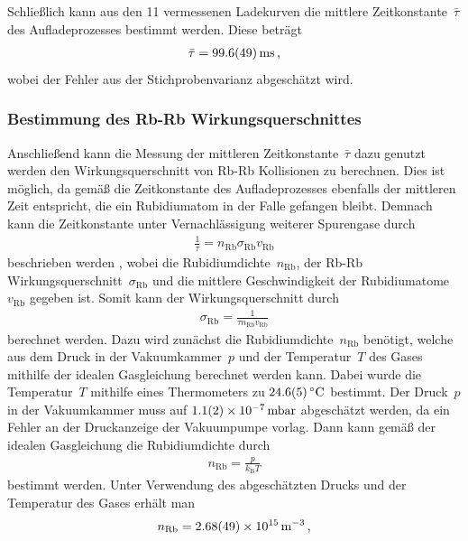 \documentclass[11pt, a4paper]{article}
\numberwithin{equation}{section}
\begin{document}
Schließlich kann aus den 11 vermessenen Ladekurven die mittlere Zeitkonstante~$\bar{\tau}$ des Aufladeprozesses bestimmt werden.
Diese beträgt
\begin{align*}
	\bar{\tau} = \SI{99.6 +- 4.9}{ms} \, \text{,}
\end{align*}
wobei der Fehler aus der Stichprobenvarianz abgeschätzt wird.

\subsubsection{Bestimmung des Rb-Rb Wirkungsquerschnittes}
Anschließend kann die Messung der mittleren Zeitkonstante~$\bar{\tau}$ dazu genutzt werden den Wirkungsquerschnitt von Rb-Rb Kollisionen zu berechnen.
Dies ist möglich, da gemäß \cite{wieman} die Zeitkonstante des Aufladeprozesses ebenfalls der mittleren Zeit entspricht, die ein Rubidiumatom in der Falle gefangen bleibt.
Demnach kann die Zeitkonstante unter Vernachlässigung weiterer Spurengase durch 
\begin{align*}
	\frac{1}{\tau} = n_\mathrm{Rb}  \sigma_\mathrm{Rb}  v_\mathrm{Rb}
\end{align*}
beschrieben werden \cite{wieman}, wobei die Rubidiumdichte~$n_\mathrm{Rb}$, der Rb-Rb Wirkungsquerschnitt~$\sigma_\mathrm{Rb}$ und die mittlere Geschwindigkeit der Rubidiumatome~$v_\mathrm{Rb}$ gegeben ist.
Somit kann der Wirkungsquerschnitt durch
\begin{align}
	\sigma_\mathrm{Rb} = \frac{1}{\tau n_\mathrm{Rb} v_\mathrm{Rb}}
	\label{eq:cross_sec}
\end{align}
berechnet werden.
Dazu wird zunächst die Rubidiumdichte~$n_\mathrm{Rb}$ benötigt, welche aus dem Druck in der Vakuumkammer~$p$ und der Temperatur~$T$ des Gases mithilfe der idealen Gasgleichung berechnet werden kann.
Dabei wurde die Temperatur~$T$ mithilfe eines Thermometers zu $\SI{24.6 +- 0.5}{\degreeCelsius}$ bestimmt.
Der Druck~$p$ in der Vakuumkammer muss auf $\SI{1.1 +- 0.2e-7}{mbar}$ abgeschätzt werden, da ein Fehler an der Druckanzeige der Vakuumpumpe vorlag.
Dann kann gemäß der idealen Gasgleichung die Rubidiumdichte durch
\begin{align*}
	n_\mathrm{Rb} = \frac{p}{k_\mathrm{B} T}
\end{align*}
bestimmt werden.
Unter Verwendung des abgeschätzten Drucks und der Temperatur des Gases erhält man
\begin{align*}
	n_\mathrm{Rb} = \SI{2.68 +- 0.49e15}{\per\meter\cubed} \, \text{,}
\end{align*}
\end{document}
